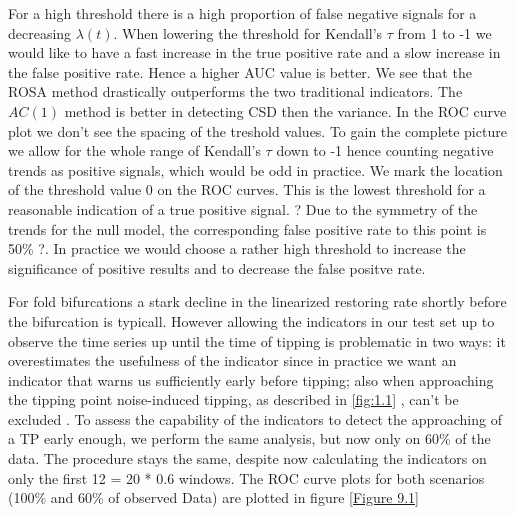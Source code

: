 \documentclass[%
thesis=student,%
coverpage=false,%
titlepage=false,%
headmarks=true, %
german,%
font=libertine, %
math=newpxtx, %
BCOR=5mm,%
coverBCOR=11mm%
]{tumbook}
\begin{document}
For a high threshold there is a high proportion of false negative signals for a decreasing $\lambda(t)$. When lowering the threshold for Kendall's $\tau$ from 1 to -1 we would like to have a fast increase in the true positive rate and a slow increase in the false positive rate. Hence a higher AUC value is better. We see that the ROSA method drastically outperforms the two traditional indicators. The $AC(1)$ method is better in detecting CSD then the variance.  
In the ROC curve plot we don't see the spacing of the treshold values. To gain the complete picture we allow for the whole range of Kendall's $\tau$ down to -1 hence counting negative trends as positive signals, which would be odd in practice. We mark the location of the threshold value 0 on the ROC curves. This is the lowest threshold for a reasonable indication of a true positive signal. ? Due to the symmetry of the trends for the null model, the corresponding false positive rate to this point is 50\% ?. In practice we would choose a rather high threshold to increase the significance of positive results and to decrease the false positve rate.

For fold bifurcations a stark decline in the linearized restoring rate shortly before the bifurcation is typicall. However allowing the indicators in our test set up to observe the time series up until the time of tipping is problematic in two ways: it overestimates the usefulness of the indicator since in practice we want an indicator that warns us sufficiently early before tipping; also when approaching the tipping point noise-induced tipping, as described in \ref{fig:1.1} , can't be excluded \cite{Ashwin:2012,Meng:2020}. To assess the capability of the indicators to detect the approaching of a TP early enough, we perform the same analysis, but now only on 60\% of the data. The procedure stays the same, despite now calculating the indicators on only the first 12 = 20 * 0.6 windows. The ROC curve plots for both scenarios (100\% and 60\% of observed Data) are plotted in figure \ref{Figure 9.1}
\end{document}
